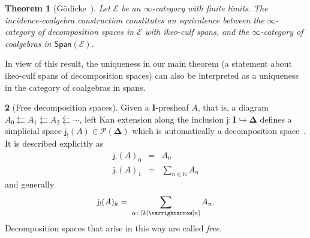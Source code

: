 \documentclass{amsart}
\newcommand{\inert}{\mathbf{I}}
\newcommand{\simpl}{\mathbf{\Delta}}
\newcommand{\basecat}{\mathcal{E}}
\newcommand{\Span}{\mathsf{Span}}
\newcommand{\lilj}{\mathsf{j}}
\newcommand{\pre}{\mathcal{P}}
\newcommand{\N}{\mathbb{N}}
\newcommand{\ract}{\varrightarrow\mapsfromchar}
\newtheorem{theorem}{Theorem}[section]
\theoremstyle{definition}
\theoremstyle{noname}
\newtheorem{blanko}[theorem]{}
\begin{document}
\begin{theorem}
  [{G\"odicke~\cite[Theorem 1.1]{Godicke:IC2SS}}]
  Let $\basecat$ be an $\infty$-category with finite limits.
  The incidence-coalgebra construction constitutes an equivalence
  between the $\infty$-category of decomposition spaces in $\basecat$ with ikeo-culf spans,
  and the $\infty$-category of coalgebras in $\Span(\basecat)$.
\end{theorem}
In view of this result, the uniqueness in our main theorem (a statement about 
ikeo-culf spans of decomposition spaces)
can also be interpreted as a uniqueness in the category of coalgebras in spans.


\begin{blanko}[Free decomposition spaces]
  Given a $\inert$-presheaf $A$, that is,
  a diagram $A_0 \leftleftarrows A_1 \leftleftarrows A_2 \leftleftarrows \cdots$, 
  left Kan extension along the inclusion $\lilj\colon \inert\hookrightarrow \simpl$ defines a simplicial space
  $\lilj_!(A) \in \pre(\simpl)$ which is automatically a decomposition 
  space~\cite[Corollary 2.3.3]{Hackney-Kock:2210.11192}. It is described explicitly as
  \begin{eqnarray*}
    \lilj_!(A)_0 & = & A_0 \\
    \lilj_!(A)_1 & = & \sum_{n\in \N} A_n
  \end{eqnarray*}
  and generally
  \begin{eqnarray*}
    \lilj_!(A)_k &=& \!\!\!\sum_{\alpha\colon [k]\ract [n]} A_n  .
  \end{eqnarray*}
  Decomposition spaces that arise in this way are called {\em free}.
\end{blanko}
\end{document}
